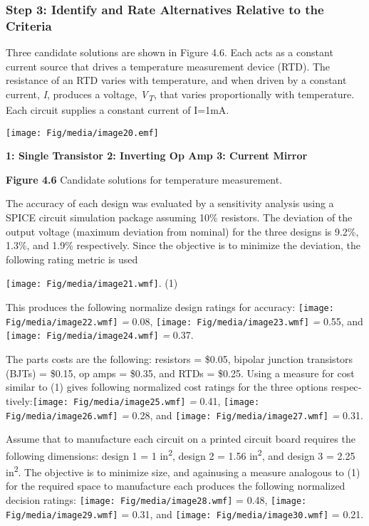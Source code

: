 \subsubsection*{Step 3: Identify and Rate Alternatives Relative to the
Criteria}\label{step-3-identify-and-rate-alternatives-relative-to-the-criteria}

Three candidate solutions are shown in Figure 4.6. Each acts as a
constant current source that drives a temperature measurement device
(RTD). The resistance of an RTD varies with temperature, and when driven
by a constant cur­rent, \emph{I}, produces a voltage,
\emph{V\textsubscript{T}}, that varies proportionally with temperature.
Each circuit supplies a constant current of I=1mA.

\texttt{[image: Fig/media/image20.emf]}

\textbf{1: Single Transistor 2: Inverting Op Amp 3: Current Mirror}

\textbf{Figure 4.6} Candidate solutions for temperature measurement.

The accuracy of each design was evaluated by a sensitivity analysis
using a SPICE cir­cuit simulation package assuming 10\% resistors. The
deviation of the output volt­age (maximum deviation from nominal) for the
three designs is 9.2\%, 1.3\%, and 1.9\% respectively. Since the
objective is to minimize the deviation, the following rating metric is
used

\texttt{[image: Fig/media/image21.wmf]}. (1)

This produces the following normalize design ratings for accuracy:
\texttt{[image: Fig/media/image22.wmf]} \emph{=} 0.08,
\texttt{[image: Fig/media/image23.wmf]} \emph{=} 0.55, and
\texttt{[image: Fig/media/image24.wmf]} \emph{=} 0.37.

The parts costs are the following: resistors = \$0.05, bipolar junction
transistors (BJTs) = \$0.15, op amps = \$0.35, and RTDs = \$0.25. Using
a measure for cost similar to (1) gives following normalized cost
ratings for the three options
respec­tively:\texttt{[image: Fig/media/image25.wmf]} \emph{=} 0.41,
\texttt{[image: Fig/media/image26.wmf]} \emph{=} 0.28, and
\texttt{[image: Fig/media/image27.wmf]} \emph{=} 0.31.

Assume that to manufacture each circuit on a printed circuit board
requires the following dimen­sions: design 1 = 1 in\textsuperscript{2},
design 2 = 1.56 in\textsuperscript{2}, and design 3 = 2.25
in\textsuperscript{2}. The objective is to minimize size, and againusing
a measure analogous to (1) for the required space to manufacture each
produces the following normalized decision ratings:
\texttt{[image: Fig/media/image28.wmf]} = 0.48,
\texttt{[image: Fig/media/image29.wmf]} = 0.31, and
\texttt{[image: Fig/media/image30.wmf]} = 0.21.

